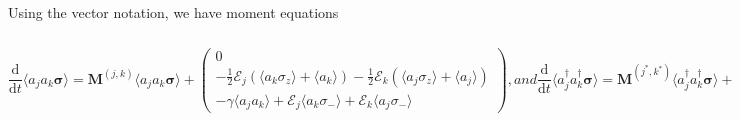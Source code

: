 \documentclass{article}
\newcommand{\ddt}[1][]{\frac{\mathrm{d} #1}{\mathrm{d}t}}
\begin{document}
Using the vector notation, we have moment equations

\begin{subequations}
	\begin{equation}
		\ddt \langle a_{j} a_{k} \bm{\sigma} \rangle = \bm{M}^{(j, k)} \langle a_{j} a_{k} \bm{\sigma} \rangle + 
		\begin{pmatrix}
			0 \\
			-\frac{1}{2} \mathcal{E}_{j} \left( \langle a_{k} \sigma_{z} \rangle + \langle a_{k} \rangle \right) - \frac{1}{2} \mathcal{E}_{k} \left( \langle a_{j} \sigma_{z} \rangle + \langle a_{j} \rangle \right) \\
			-\gamma \langle a_{j} a_{k} \rangle + \mathcal{E}_{j} \langle a_{k} \sigma_{-} \rangle + \mathcal{E}_{k} \langle a_{j} \sigma_{-} \rangle
		\end{pmatrix},
	\end{equation}
	and
	\begin{equation}
		\ddt \langle a^{\dagger}_{j} a^{\dagger}_{k} \bm{\sigma} \rangle = \bm{M}^{(j^{*}, k^{*})} \langle a^{\dagger}_{j} a^{\dagger}_{k} \bm{\sigma} \rangle + 
		\begin{pmatrix}
			-\frac{1}{2} \mathcal{E}_{j}^{*} \left( \langle a^{\dagger}_{k} \sigma_{z} \rangle + \langle a^{\dagger}_{k} \rangle \right) - \frac{1}{2} \mathcal{E}_{k}^{*} \left( \langle a^{\dagger}_{j} \sigma_{z} \rangle + \langle a^{\dagger}_{j} \rangle \right) \\
			0 \\
			-\gamma \langle a^{\dagger}_{j} a^{\dagger}_{k} \rangle + \mathcal{E}_{j}^{*} \langle a^{\dagger}_{k} \sigma_{+} \rangle + \mathcal{E}_{k}^{*} \langle a^{\dagger}_{j} \sigma_{+} \rangle
		\end{pmatrix},
	\end{equation}
	and
	\begin{equation}
	\ddt \langle a^{\dagger}_{j} a_{k} \bm{\sigma} \rangle = \bm{M}^{(j^{*}, k)} \langle a^{\dagger}_{j} a_{k} \bm{\sigma} \rangle + 
	\begin{pmatrix}
		-\frac{1}{2} \mathcal{E}_{j}^{*} \left( \langle a_{k} \sigma_{z} \rangle + \langle a_{k} \rangle \right) \\
		-\frac{1}{2} \mathcal{E}_{k} \left( \langle a^{\dagger}_{j} \sigma_{z} \rangle + \langle a^{\dagger}_{j} \rangle \right) \\
		-\gamma \langle a^{\dagger}_{j} a_{k} \rangle + \mathcal{E}_{j}^{*} \langle a_{k} \sigma_{+} \rangle + \mathcal{E}_{k} \langle a^{\dagger}_{j} \sigma_{-} \rangle
	\end{pmatrix},
	\end{equation}
\end{subequations}
\end{document}
